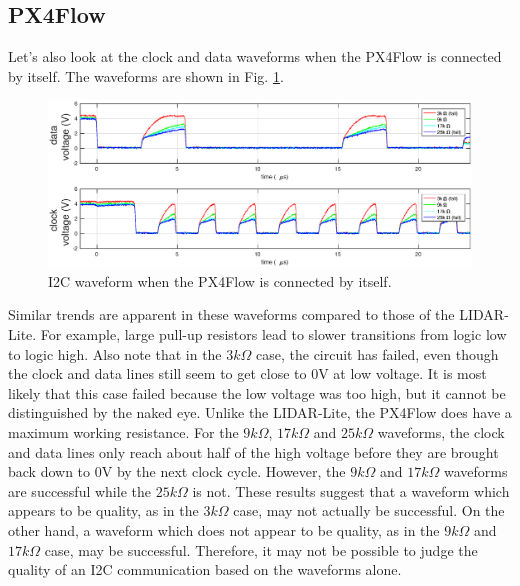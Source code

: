 \documentclass[10pt]{article}
\begin{document}
\subsection*{PX4Flow}

Let's also look at the clock and data waveforms when the PX4Flow is connected by itself. The waveforms are shown in Fig. \ref{fig:PX}.
\begin{figure}[ht]
\centering

\includegraphics[width=1.0\textwidth]{2pt5microsec/PX_cropped.eps}
\caption{I2C waveform when the PX4Flow is connected by itself.}
\label{fig:PX}
\end{figure}
Similar trends are apparent in these waveforms compared to those of the LIDAR-Lite. For example, large pull-up resistors lead to slower transitions from logic low to logic high. Also note that in the $3 k \Omega$ case, the circuit has failed, even though the clock and data lines still seem to get close to 0V at low voltage. It is most likely that this case failed because the low voltage was too high, but it cannot be distinguished by the naked eye. Unlike the LIDAR-Lite, the PX4Flow does have a maximum working resistance. For the $9 k \Omega$, $17 k \Omega$ and $25 k \Omega$ waveforms, the clock and data lines only reach about half of the high voltage before they are brought back down to 0V by the next clock cycle. However, the $9 k \Omega$ and $17 k \Omega$ waveforms are successful while the $25 k \Omega$ is not. These results suggest that a waveform which appears to be quality, as in the $3 k \Omega$ case, may not actually be successful. On the other hand, a waveform which does not appear to be quality, as in the $9 k \Omega$ and $17 k \Omega$ case, may be successful. Therefore, it may not be possible to judge the quality of an I2C communication based on the waveforms alone.
\end{document}
